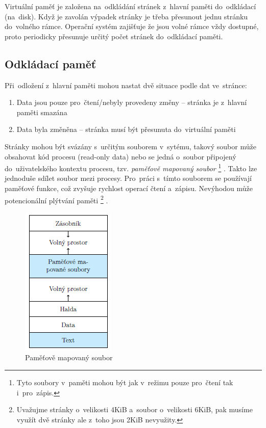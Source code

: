 Virtuální paměť je založena na~odkládání stránek z~hlavní paměti do~odkládací (na~disk). Když je zavolán výpadek stránky je třeba přesunout jednu stránku do~volného rámce. Operační systém zajišťuje že jsou volné rámce vždy dostupné, proto periodicky přesunuje určitý počet stránek do~odkládací paměti.

\subsection{Odkládací paměť}

Při~odložení z~hlavní paměti mohou nastat dvě situace podle dat ve~stránce:

\begin{enumerate}
	\item Data jsou pouze pro~čtení/nebyly provedeny změny -- stránka je z~hlavní paměti smazána
	\item Data byla změněna -- stránka musí být přesunuta do~virtuální paměti
\end{enumerate}

Stránky mohou být svázány s~určitým souborem v~sytému, takový soubor může obsahovat kód procesu (read-only data) nebo se jedná o~soubor připojený do~uživatelského kontextu procesu, tzv. \emph{paměťově mapovaný soubor}%
\footnote{Tyto soubory v~paměti mohou být jak v~režimu pouze pro~čtení tak i~pro~zápis.}%
. Takto lze jednoduše sdílet soubor mezi procesy. Pro~práci s~tímto souborem se používají paměťové funkce, což zvyšuje rychlost operací čtení a~zápisu. Nevýhodou může potencionální plýtvání paměti%
\footnote{Uvažujme stránky o~velikosti 4KiB a~soubor o~velikosti 6KiB, pak musíme využít dvě stránky ale z~toho jsou 2KiB nevyužity.}%
.

\begin{figure}[ht]
	\centering
	\includegraphics[scale=1]{images/mem_page_file.png}
	\caption{Paměťově mapovaný soubor}
	\label{mem_page_file}
\end{figure}

